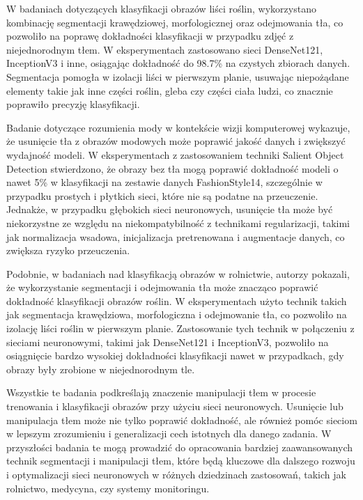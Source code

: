 W badaniach dotyczących klasyfikacji obrazów liści roślin, wykorzystano kombinację segmentacji 
krawędziowej, morfologicznej oraz odejmowania tła, co pozwoliło na poprawę dokładności klasyfikacji 
w przypadku zdjęć z niejednorodnym tłem. W eksperymentach zastosowano sieci DenseNet121, 
InceptionV3 i inne, osiągając dokładność do 98.7\% na czystych zbiorach danych. Segmentacja pomogła 
w izolacji liści w pierwszym planie, usuwając niepożądane elementy takie jak inne części roślin, 
gleba czy części ciała ludzi, co znacznie poprawiło precyzję klasyfikacji. \cite{bg_3} 


Badanie dotyczące rozumienia mody w kontekście wizji komputerowej wykazuje, że usunięcie tła z obrazów modowych może poprawić jakość danych i zwiększyć wydajność modeli. W eksperymentach z zastosowaniem techniki Salient Object 
Detection stwierdzono, że obrazy bez tła mogą poprawić dokładność modeli o nawet 5\% w klasyfikacji na zestawie danych FashionStyle14, szczególnie w przypadku prostych i płytkich sieci, które nie są podatne na przeuczenie. 
Jednakże, w przypadku głębokich sieci neuronowych, usunięcie tła może być niekorzystne ze względu na niekompatybilność z technikami regularizacji, takimi jak normalizacja wsadowa, inicjalizacja pretrenowana i augmentacje danych, co 
zwiększa ryzyko przeuczenia. \cite{bg_5}


Podobnie, w badaniach nad klasyfikacją obrazów w rolnictwie, autorzy pokazali, 
że wykorzystanie segmentacji i odejmowania tła może znacząco poprawić dokładność klasyfikacji 
obrazów roślin. W eksperymentach użyto technik takich jak segmentacja krawędziowa, morfologiczna i 
odejmowanie tła, co pozwoliło na izolację liści roślin w pierwszym planie. Zastosowanie tych 
technik w połączeniu z sieciami neuronowymi, takimi jak DenseNet121 i InceptionV3, pozwoliło na 
osiągnięcie bardzo wysokiej dokładności klasyfikacji nawet w przypadkach, gdy obrazy były zrobione 
w niejednorodnym tle. \cite{bg_4}


Wszystkie te badania podkreślają znaczenie manipulacji tłem w procesie trenowania i klasyfikacji 
obrazów przy użyciu sieci neuronowych. Usunięcie lub manipulacja tłem może nie tylko poprawić 
dokładność, ale również pomóc sieciom w lepszym zrozumieniu i generalizacji cech istotnych dla 
danego zadania. W przyszłości badania te mogą prowadzić do opracowania bardziej zaawansowanych 
technik segmentacji i manipulacji tłem, które będą kluczowe dla dalszego rozwoju i optymalizacji 
sieci neuronowych w różnych dziedzinach zastosowań, takich jak rolnictwo, medycyna, czy systemy 
monitoringu.

